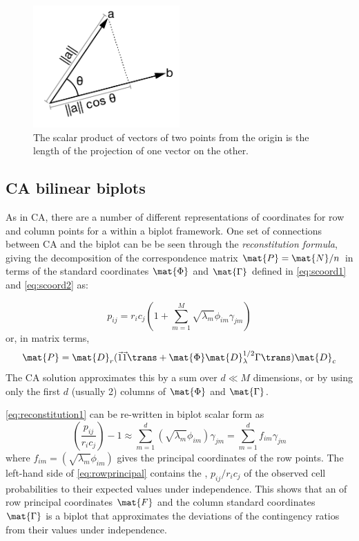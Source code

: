 \documentclass[11pt]{book}
\begin{document}
\begin{figure}[!htb]
 \centering
 \includegraphics[width=0.5\textwidth]{ch06/fig/Scalarproduct}
 \caption[The scalar product of vectors of two points from the origin]{The scalar product of vectors of two points from the origin is the 
 length of the projection of one vector on the other.}\label{fig:Scalarproduct}
\end{figure}

\subsection{CA bilinear biplots}
As in CA, there are a number of different representations of coordinates for row and column
points for a \ctab
within a biplot framework.  One set of
connections between CA and the biplot can be
be seen through the \emph{reconstitution formula}, giving the decomposition of the
correspondence matrix $\mat{P} = \mat{N} / n$ in terms of the standard coordinates
$\mat{\Phi}$ and $\mat{\Gamma}$ defined in \eqref{eq:scoord1} and \eqref{eq:scoord2}
as:

\begin{equation}\label{eq:reconstitution1}
  p_{ij} = r_i c_j \left(1 + \sum_{m=1}^M \sqrt{\lambda_m} \phi_{im} \gamma_{jm} \right)
\end{equation}
or, in matrix terms,
\begin{equation}\label{eq:reconstitution2}
  \mat{P} = \mat{D}_r (\vec{1} \vec{1}\trans + \mat{\Phi} \mat{D}_\lambda^{1/2} \Gamma\trans) \mat{D}_c
\end{equation}
The CA solution approximates this by a sum over $d \ll M  $ dimensions, or by using only
the first $d$ (usually 2) columns of $\mat{\Phi}$ and $\mat{\Gamma}$.

\eqref{eq:reconstitution1} can be re-written in biplot scalar form as
\begin{equation}\label{eq:rowprincipal}
  \left( \frac{p_{ij}} {r_i c_j} \right) - 1 
  \approx 
  \sum_{m=1}^d (\sqrt{\lambda_m} \phi_{im})  \gamma_{jm} 
=  \sum_{m=1}^d f_{im} \gamma_{jm} 
\end{equation}
where $f_{im} = (\sqrt{\lambda_m} \phi_{im})$ gives the principal coordinates of the row
points.  The left-hand side of \eqref{eq:rowprincipal} contains the
, $p_{ij} /{r_i c_j}$ of the observed cell
probabilities to their expected values under independence.
This shows that an  of row principal coordinates $\mat{F}$
and the column standard coordinates $\mat{\Gamma}$ is a biplot that approximates
the deviations of the contingency ratios from their values under independence.
\end{document}
